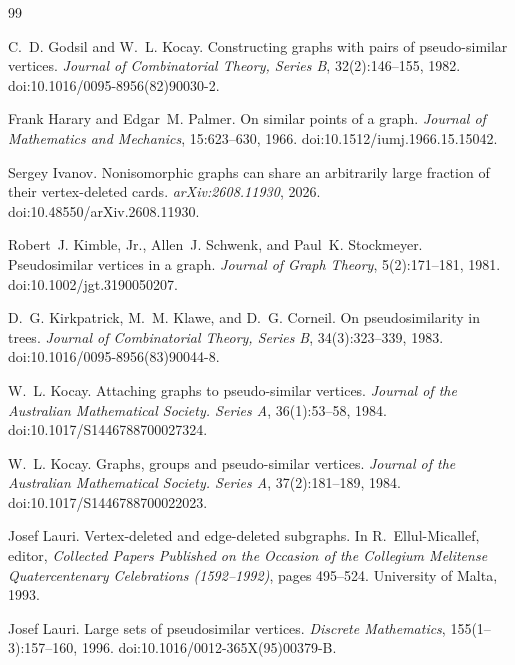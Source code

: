 \documentclass[11pt]{article}
\theoremstyle{definition}
\theoremstyle{remark}
\begin{document}
\begin{thebibliography}{99}

C.~D. Godsil and W.~L. Kocay.
\newblock Constructing graphs with pairs of pseudo-similar vertices.
\newblock \emph{Journal of Combinatorial Theory, Series B}, 32(2):146--155, 1982.
\newblock doi:10.1016/0095-8956(82)90030-2.

Frank Harary and Edgar~M. Palmer.
\newblock On similar points of a graph.
\newblock \emph{Journal of Mathematics and Mechanics}, 15:623--630, 1966.
\newblock doi:10.1512/iumj.1966.15.15042.

Sergey Ivanov.
\newblock Nonisomorphic graphs can share an arbitrarily large fraction of their vertex-deleted cards.
\newblock \emph{arXiv:2608.11930}, 2026.
\newblock doi:10.48550/arXiv.2608.11930.

Robert~J. Kimble, Jr., Allen~J. Schwenk, and Paul~K. Stockmeyer.
\newblock Pseudosimilar vertices in a graph.
\newblock \emph{Journal of Graph Theory}, 5(2):171--181, 1981.
\newblock doi:10.1002/jgt.3190050207.

D.~G. Kirkpatrick, M.~M. Klawe, and D.~G. Corneil.
\newblock On pseudosimilarity in trees.
\newblock \emph{Journal of Combinatorial Theory, Series B}, 34(3):323--339, 1983.
\newblock doi:10.1016/0095-8956(83)90044-8.

W.~L. Kocay.
\newblock Attaching graphs to pseudo-similar vertices.
\newblock \emph{Journal of the Australian Mathematical Society. Series A}, 36(1):53--58, 1984.
\newblock doi:10.1017/S1446788700027324.

W.~L. Kocay.
\newblock Graphs, groups and pseudo-similar vertices.
\newblock \emph{Journal of the Australian Mathematical Society. Series A}, 37(2):181--189, 1984.
\newblock doi:10.1017/S1446788700022023.

Josef Lauri.
\newblock Vertex-deleted and edge-deleted subgraphs.
\newblock In R.~Ellul-Micallef, editor, \emph{Collected Papers Published on the Occasion of the Collegium Melitense Quatercentenary Celebrations (1592--1992)}, pages 495--524. University of Malta, 1993.

Josef Lauri.
\newblock Large sets of pseudosimilar vertices.
\newblock \emph{Discrete Mathematics}, 155(1--3):157--160, 1996.
\newblock doi:10.1016/0012-365X(95)00379-B.


\end{thebibliography}
\end{document}
